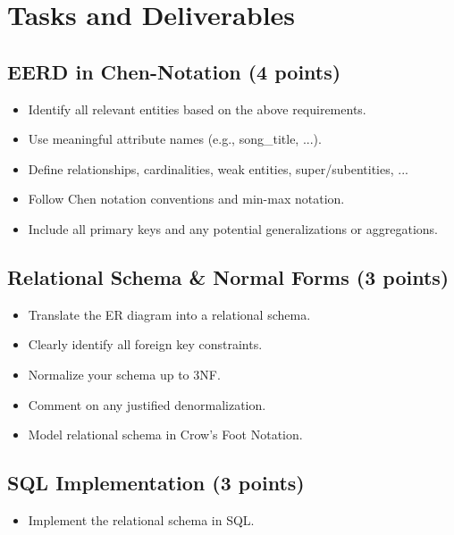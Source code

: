 \section{Tasks and Deliverables}

\subsection{EERD in Chen-Notation (4 points)}

\begin{itemize}[label=--]
    \item Identify all relevant entities based on the above requirements.
    \item Use meaningful attribute names (e.g., song\_title, ...).
    \item Define relationships, cardinalities, weak entities, super/subentities, ...
    \item Follow Chen notation conventions and min-max notation.
    \item Include all primary keys and any potential generalizations or aggregations.
\end{itemize}

\subsection{Relational Schema \& Normal Forms (3 points)}

\begin{itemize}[label=--]
    \item Translate the ER diagram into a relational schema.
    \item Clearly identify all foreign key constraints.
    \item Normalize your schema up to 3NF.
    \item Comment on any justified denormalization.
    \item Model relational schema in Crow’s Foot Notation.
\end{itemize}

\subsection{SQL Implementation (3 points)}

\begin{itemize}[label=--]
    \item Implement the relational schema in SQL.
\end{itemize}